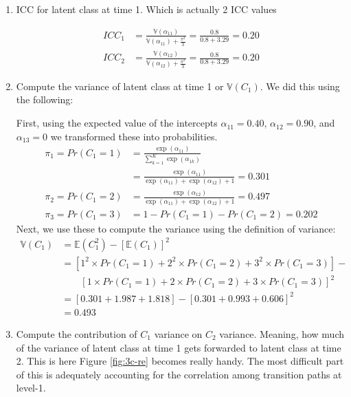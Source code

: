 \documentclass[12pt]{article}
\begin{document}
\begin{enumerate}
\item ICC for latent class at time 1. Which is actually 2 ICC values

\begin{align*}
ICC_1 &= \frac{\mathbb{V}(\alpha_{11})}{\mathbb{V}(\alpha_{11}) + \frac{\pi^2}{3}}=\frac{0.8}{0.8 + 3.29}=0.20\\
ICC_2 &= \frac{\mathbb{V}(\alpha_{12})}{\mathbb{V}(\alpha_{12}) + \frac{\pi^2}{3}}=\frac{0.8}{0.8 + 3.29}=0.20
\end{align*}

\item Compute the variance of latent class at time 1 or $\mathbb{V}(C_1)$. We did this using the following:

First, using the expected value of the intercepts $\alpha_{11}=0.40$, $\alpha_{12}=0.90$, and $\alpha_{13}=0$ we transformed these into probabilities.
\begin{align*}
\pi_{1}=Pr(C_1 =1) &= \frac{\exp(\alpha_{11})}{\sum_{k=1}^K\exp(\alpha_{1k})}\\
 &= \frac{\exp(\alpha_{11})}{\exp(\alpha_{11}) + \exp(\alpha_{12}) + 1}=0.301\\
\pi_{2}= Pr(C_1 =2) &=  \frac{\exp(\alpha_{12})}{\exp(\alpha_{11}) + \exp(\alpha_{12}) + 1}=0.497\\
\pi_{3}= Pr(C_1 = 3) &= 1 - Pr(C_1=1) - Pr(C_1=2)=0.202
\end{align*}
Next, we use these to compute the variance using the definition of variance:
\begin{align*}
\mathbb{V}(C_1) &= \mathbb{E}(C_1^2) - [\mathbb{E}(C_1)]^2\\
 &= \left[1^2\times Pr(C_1 =1) + 2^2\times Pr(C_1 =2) + 3^2\times Pr(C_1 =3) \right] -\\&\qquad \left[1\times Pr(C_1 =1) + 2\times Pr(C_1 =2) + 3\times Pr(C_1 =3)\right]^2\\
 &= \left[0.301 + 1.987 + 1.818\right] - \left[0.301 + 0.993 + 0.606\right]^2\\
 &= 0.493
\end{align*}

\item Compute the contribution of $C_1$ variance on $C_2$ variance. Meaning, how much of the variance of latent class at time 1 gets forwarded to latent class at time 2. This is here Figure \ref{fig:3c-re} becomes really handy.
The most difficult part of this is adequately accounting for the correlation among transition paths at level-1.


\end{enumerate}
\end{document}
